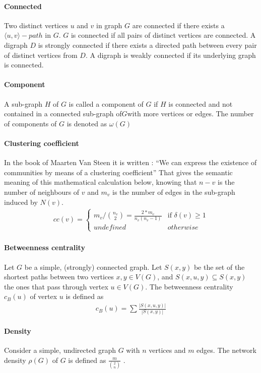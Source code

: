 \documentclass{article}
\begin{document}
		\paragraph{Connected}
			Two distinct vertices $u$ and $v$ in graph $G$ are connected if there exists a $\langle u, v \rangle - path$ in $G$.
			$G$ is connected if all pairs of distinct vertices are connected.
			A digraph $D$ is strongly connected if there exists a directed path between every pair of distinct vertices from $D$.
			A digraph is weakly connected if its underlying graph is connected.
		\paragraph{Component}
			A sub-graph $H$ of $G$ is called a component of $G$ if $H$ is connected
			and not contained in a connected sub-graph of$G$with more vertices or edges.
			The number of components of $G$ is denoted as $\omega(G)$
		\paragraph{Clustering coefficient}
			In the book of Maarten Van Steen it is written :
			``We can express the existence of communities by means of a clustering coefficient''\cite{Steen10}
			That gives the semantic meaning of this mathematical calculation below,
			knowing that $n-v$ is the number of neighbours of $v$
			and $m_v$ is the number of edges in the sub-graph induced by $N(v)$.
		\begin{align*}
			cc(v) = \begin{cases}
				m_v/ \binom{n_v}{2} = \frac{2*m_v}{n_v(n_v-1)} & \text{if } \delta(v) \ge 1 \\
				undefined & otherwise
			\end{cases}
		\end{align*}
		\paragraph{Betweenness centrality}
			Let $G$ be a simple, (strongly) connected graph.
			Let $S(x, y)$ be the set of the shortest paths between two vertices $x, y \in V(G)$,
			and $S(x, u, y) \subseteq S(x, y)$ the ones that pass through vertex $u \in V (G)$.
			The betweenness centrality $c_B (u)$ of vertex $u$ is defined as
		\begin{align*}
			c_B (u) = \sum \frac{|S(x,u,y)|}{|S(x,y)|}
		\end{align*}
		\paragraph{Density}
			Consider a simple, undirected graph $G$ with $n$ vertices and $m$ edges.
			The network density $\rho(G)$ of $G$ is defined as $\frac{m}{\binom{2}{n}}$ .
\end{document}
